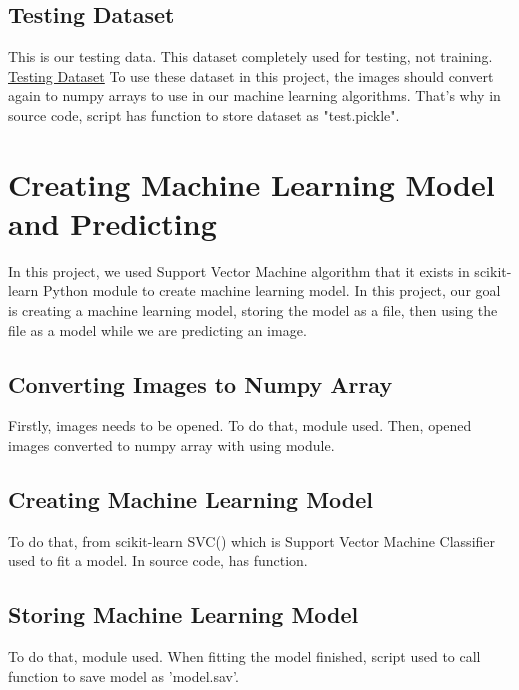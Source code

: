 \documentclass[onecolumn]{article}
\begin{document}
\subsection{Testing Dataset}
This is our testing data. This dataset completely used for testing, not training.
\newline
\href{https://www.kaggle.com/kushleshkumar/cats-and-dogs}{Testing Dataset}
\newline
\newline
To use these dataset in this project, the images should convert again to numpy arrays to use in our machine learning algorithms. That's why in source code,  script has  function to store dataset as "test.pickle".

\section{Creating Machine Learning Model and Predicting}
In this project, we used Support Vector Machine algorithm that it exists in scikit-learn Python module to create machine learning model. In this project, our goal is creating a machine learning model, storing the model as a file, then using the file as a model while we are predicting an image.

\subsection{Converting Images to Numpy Array}
Firstly, images needs to be opened. To do that,  module used. Then, opened images converted to numpy array with using  module.

\subsection{Creating Machine Learning Model}
To do that, from scikit-learn SVC() which is Support Vector Machine Classifier used to fit a model. In source code,  has  function.

\subsection{Storing Machine Learning Model}
To do that,  module used. When fitting the model finished,  script used to call  function to save model as 'model.sav'.
\end{document}
